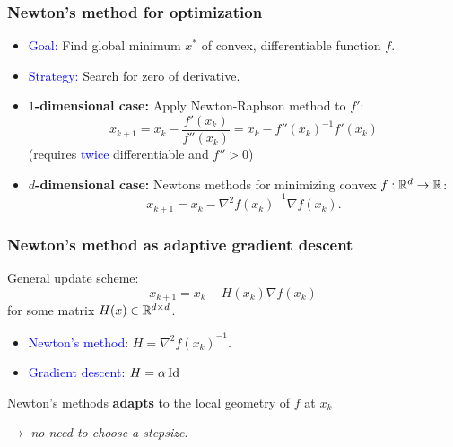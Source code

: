 \documentclass[aspectratio=149]{beamer}
\begin{document}
\begin{frame}
  \frametitle{Newton's method for optimization}
  \begin{itemize}
    \item \textcolor{blue}{Goal:} Find global minimum $x^*$ of convex, differentiable function $f$.
    \item \textcolor{blue}{Strategy:} Search for zero of derivative.
    \item \textbf{$1$-dimensional case:} Apply Newton-Raphson method to $f'$:
          \begin{equation}
            x_{k+1} = x_k - \frac{f'(x_k)}{f''(x_k)} = x_k - {f''(x_k)}^{-1} f'(x_k)
          \end{equation}
          (requires \textcolor{blue}{twice} differentiable and $f'' > 0$)

    \item \textbf{$d$-dimensional case:} Newtons methods for minimizing convex $f: \mathbb{R}^d \to \mathbb{R}$:
          \begin{equation}
            x_{k+1} = x_k - {\nabla^2 f(x_k)}^{-1} \nabla f(x_k).
          \end{equation}
  \end{itemize}
\end{frame}


\begin{frame}
  \frametitle{Newton's method as adaptive gradient descent}
  General update scheme:
  \begin{equation}
    x_{k+1} = x_k - H(x_k) \nabla f(x_k)
  \end{equation}
  for some matrix $H(x) \in \mathbb{R}^{d \times d}$.
  \begin{itemize}
    \item \textcolor{blue}{Newton's method}: $H = {\nabla^2 f(x_k)}^{-1}$.
    \item \textcolor{blue}{Gradient descent}: $H = \alpha \operatorname*{Id}$
  \end{itemize}
  \vspace{1cm}
 \begin{block}{}
  Newton's methods \textbf{adapts} to the local geometry of $f$ at $x_k$ \\
 \end{block}
  $\rightarrow$ \textit{no need to choose a stepsize}.
\end{frame}
\end{document}
